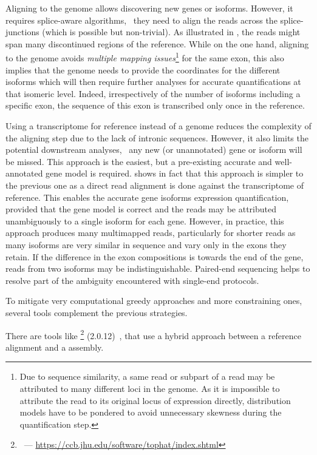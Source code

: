 Aligning to the genome allows discovering new genes or isoforms. However, it
requires splice-aware algorithms, \ie\ they need to align the
reads across the splice-junctions (which is possible but non-trivial).
As illustrated in ,
the reads might span many discontinued regions of the reference.
While on the one hand, aligning to the genome avoids \emph{multiple mapping
issues}\footnote{Due to sequence similarity, a same read or subpart of a read
may be attributed to many different loci in the genome. As it is
impossible to attribute the read to its original locus of expression directly,
distribution models have to be pondered to avoid unnecessary skewness during
the quantification step.} for the same exon, this also implies that
the genome needs to provide the coordinates for the different isoforms
which will then require further analyses for accurate quantifications at that
isomeric level.
Indeed, irrespectively of the number of isoforms including a specific exon,
the sequence of this exon is transcribed only once in the reference.\mybr\


Using a transcriptome for reference instead of a genome reduces the complexity
of the aligning step due to the lack of intronic sequences.
However, it also limits the potential downstream analyses,
\eg\ any new (or unannotated) gene or isoform will be missed.
This approach is the easiest, but a pre-existing
accurate and well-annotated gene model is required.
 shows in fact that this approach is simpler
to the previous one as a direct read alignment is done against the
transcriptome of reference.
This enables the accurate gene isoforms expression quantification,
provided that the gene model is correct and the reads may be
attributed unambiguously to a single isoform for each gene.
However, in practice, this approach produces many multimapped reads,
particularly for shorter reads as
many isoforms are very similar in sequence and vary only in the exons
they retain.
If the difference in the exon compositions is towards the end of the gene,
reads from two isoforms may be indistinguishable.
Paired-end sequencing helps to resolve part of the ambiguity encountered
with single-end protocols.\mybr\

To mitigate very computational greedy approaches and more constraining
ones, several tools complement the previous strategies.\mybr\

There are tools like \toph\footnote{\toph\ ---
\href{https://ccb.jhu.edu/software/tophat/index.shtml}
{https://ccb.jhu.edu/software/tophat/index.shtml}} (2.0.12)~,
that use a hybrid approach
between a reference alignment and a  assembly.\mybr\

